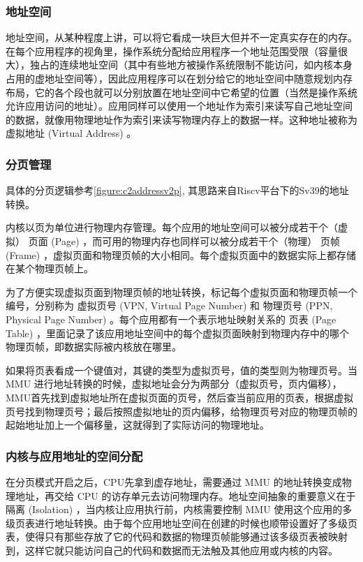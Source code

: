 \subsubsection{地址空间}

地址空间，从某种程度上讲，可以将它看成一块巨大但并不一定真实存在的内存。在每个应用程序的视角里，操作系统分配给应用程序一个地址范围受限（容量很大），独占的连续地址空间（其中有些地方被操作系统限制不能访问，如内核本身占用的虚地址空间等），因此应用程序可以在划分给它的地址空间中随意规划内存布局，它的各个段也就可以分别放置在地址空间中它希望的位置（当然是操作系统允许应用访问的地址）。应用同样可以使用一个地址作为索引来读写自己地址空间的数据，就像用物理地址作为索引来读写物理内存上的数据一样。这种地址被称为 虚拟地址 (Virtual Address) 。


\subsubsection{分页管理}

具体的分页逻辑参考\autoref{figure:c2addressv2p}, 其思路来自Riscv平台下的Sv39的地址转换。

内核以页为单位进行物理内存管理。每个应用的地址空间可以被分成若干个（虚拟） 页面 (Page) ，而可用的物理内存也同样可以被分成若干个（物理） 页帧 (Frame) ，虚拟页面和物理页帧的大小相同。每个虚拟页面中的数据实际上都存储在某个物理页帧上。

为了方便实现虚拟页面到物理页帧的地址转换，标记每个虚拟页面和物理页帧一个编号，分别称为 虚拟页号 (VPN, Virtual Page Number) 和 物理页号 (PPN, Physical Page Number) 。每个应用都有一个表示地址映射关系的 页表 (Page Table) ，里面记录了该应用地址空间中的每个虚拟页面映射到物理内存中的哪个物理页帧，即数据实际被内核放在哪里。

如果将页表看成一个键值对，其键的类型为虚拟页号，值的类型则为物理页号。当 MMU 进行地址转换的时候，虚拟地址会分为两部分（虚拟页号，页内偏移），MMU首先找到虚拟地址所在虚拟页面的页号，然后查当前应用的页表，根据虚拟页号找到物理页号；最后按照虚拟地址的页内偏移，给物理页号对应的物理页帧的起始地址加上一个偏移量，这就得到了实际访问的物理地址。

\subsubsection{内核与应用地址的空间分配}

在分页模式开启之后，CPU先拿到虚存地址，需要通过 MMU 的地址转换变成物理地址，再交给 CPU 的访存单元去访问物理内存。地址空间抽象的重要意义在于 隔离 (Isolation) ，当内核让应用执行前，内核需要控制 MMU 使用这个应用的多级页表进行地址转换。由于每个应用地址空间在创建的时候也顺带设置好了多级页表，使得只有那些存放了它的代码和数据的物理页帧能够通过该多级页表被映射到，这样它就只能访问自己的代码和数据而无法触及其他应用或内核的内容。


